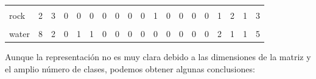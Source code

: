 \documentclass[
  12pt,
]{extreport}
\begin{document}
\begin{table}[H]
\begin{tabular}[t]{lrrrrrrrrrrrrrrrrrr}
\cellcolor{gray!10}{psychic} & \cellcolor{gray!10}{3} & \cellcolor{gray!10}{0} & \cellcolor{gray!10}{0} & \cellcolor{gray!10}{1} & \cellcolor{gray!10}{0} & \cellcolor{gray!10}{0} & \cellcolor{gray!10}{0} & \cellcolor{gray!10}{0} & \cellcolor{gray!10}{0} & \cellcolor{gray!10}{0} & \cellcolor{gray!10}{0} & \cellcolor{gray!10}{0} & \cellcolor{gray!10}{0} & \cellcolor{gray!10}{0} & \cellcolor{gray!10}{4} & \cellcolor{gray!10}{0} & \cellcolor{gray!10}{0} & \cellcolor{gray!10}{1}\\
\addlinespace
rock & 2 & 3 & 0 & 0 & 0 & 0 & 0 & 0 & 0 & 1 & 0 & 0 & 0 & 0 & 1 & 2 & 1 & 3\\
\cellcolor{gray!10}{steel} & \cellcolor{gray!10}{0} & \cellcolor{gray!10}{1} & \cellcolor{gray!10}{0} & \cellcolor{gray!10}{0} & \cellcolor{gray!10}{0} & \cellcolor{gray!10}{0} & \cellcolor{gray!10}{0} & \cellcolor{gray!10}{0} & \cellcolor{gray!10}{0} & \cellcolor{gray!10}{0} & \cellcolor{gray!10}{0} & \cellcolor{gray!10}{0} & \cellcolor{gray!10}{0} & \cellcolor{gray!10}{0} & \cellcolor{gray!10}{0} & \cellcolor{gray!10}{3} & \cellcolor{gray!10}{1} & \cellcolor{gray!10}{2}\\
water & 8 & 2 & 0 & 1 & 1 & 0 & 0 & 0 & 0 & 0 & 0 & 0 & 0 & 0 & 2 & 1 & 1 & 5\\
\bottomrule
\end{tabular}
\end{table}

Aunque la representación no es muy clara debido a las dimensiones de la
matriz y el amplio número de clases, podemos obtener algunas
conclusiones:
\end{document}
